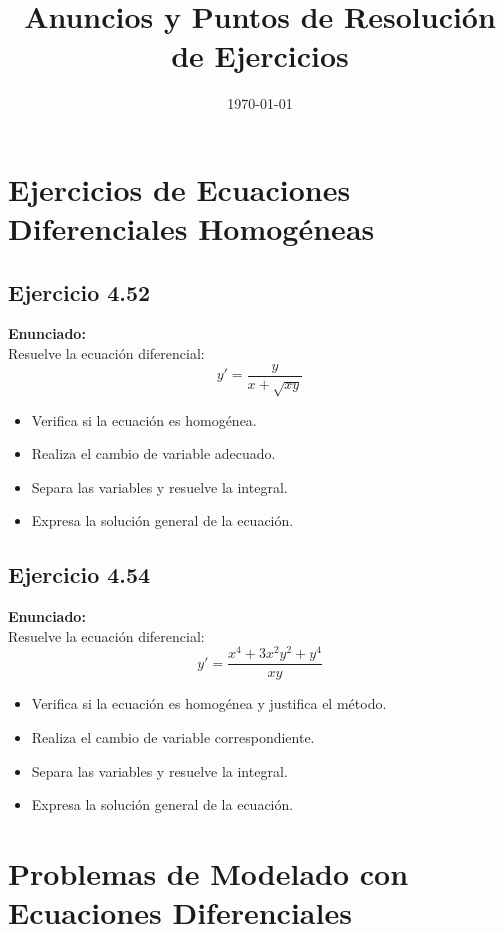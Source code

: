 \documentclass[12pt,a4paper]{article}
\title{Anuncios y Puntos de Resolución de Ejercicios}
\author{}
\date{\today}
\begin{document}
\maketitle


\section*{Ejercicios de Ecuaciones Diferenciales Homogéneas}

\subsection*{Ejercicio 4.52}
\textbf{Enunciado:}
\\
Resuelve la ecuación diferencial:
\[
y' = \frac{y}{x + \sqrt{xy}}
\]
\begin{itemize}[leftmargin=2em]
    \item Verifica si la ecuación es homogénea.
    \item Realiza el cambio de variable adecuado.
    \item Separa las variables y resuelve la integral.
    \item Expresa la solución general de la ecuación.
\end{itemize}

\subsection*{Ejercicio 4.54}
\textbf{Enunciado:}
\\
Resuelve la ecuación diferencial:
\[
y' = \frac{x^4 + 3x^2y^2 + y^4}{xy}
\]
\begin{itemize}[leftmargin=2em]
    \item Verifica si la ecuación es homogénea y justifica el método.
    \item Realiza el cambio de variable correspondiente.
    \item Separa las variables y resuelve la integral.
    \item Expresa la solución general de la ecuación.
\end{itemize}


\section*{Problemas de Modelado con Ecuaciones Diferenciales}
\end{document}
